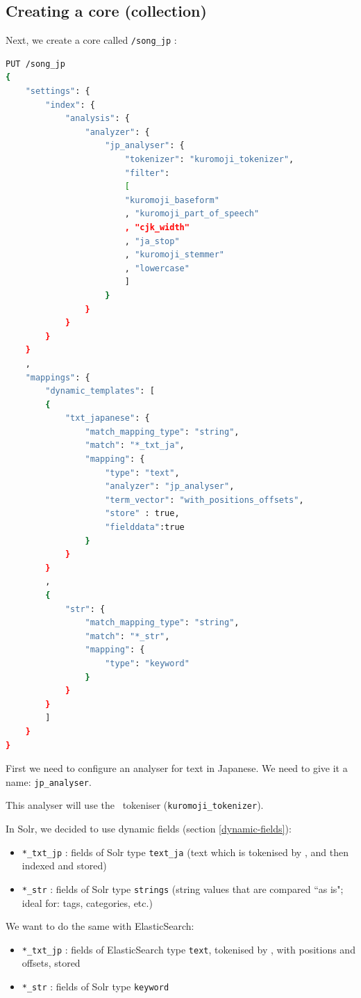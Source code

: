 \subsection{Creating a core (collection)} \label{create-es-core}

Next, we create a core called \texttt{/song\_jp} : \\

\begin{lstlisting}[language=sh]
PUT /song_jp
{
	"settings": {
		"index": {
			"analysis": {
				"analyzer": {
					"jp_analyser": {
						"tokenizer": "kuromoji_tokenizer",
						"filter": 
						[
						"kuromoji_baseform"
						, "kuromoji_part_of_speech"
						, "cjk_width"
						, "ja_stop"
						, "kuromoji_stemmer"
						, "lowercase"
						]
					}
				}
			}
		}
	}
	,
	"mappings": {
		"dynamic_templates": [
		{
			"txt_japanese": {
				"match_mapping_type": "string",
				"match": "*_txt_ja",
				"mapping": {
					"type": "text",
					"analyzer": "jp_analyser",
					"term_vector": "with_positions_offsets",
					"store" : true,
					"fielddata":true
				}
			}
		}
		,
		{
			"str": {
				"match_mapping_type": "string",
				"match": "*_str",
				"mapping": {
					"type": "keyword"
				}
			}
		}
		]
	}
}
\end{lstlisting}




\bigskip

First we need to configure an analyser for text in Japanese. We need to give it a name: \texttt{jp\_analyser}. 

This analyser will use the \kuromoji\ tokeniser (\texttt{kuromoji\_tokenizer}). \\


\bigskip

\newpage

In Solr, we decided to use dynamic fields (section \ref{dynamic-fields}): 

\begin{itemize}
	\item \texttt{*\_txt\_jp} : fields of Solr type \texttt{text\_ja} (text which is tokenised by \kuromoji, and then indexed and stored)
	
	\item \texttt{*\_str} : fields of Solr type \texttt{strings} (string values that are compared ``as is"; ideal for: tags, categories, etc.)
\end{itemize}

\bigskip

We want to do the same with ElasticSearch:
\begin{itemize}
	\item \texttt{*\_txt\_jp} : fields of ElasticSearch type \texttt{text}, tokenised by \kuromoji, with positions and offsets, stored
	
	\item \texttt{*\_str} : fields of Solr type \texttt{keyword}
\end{itemize}


